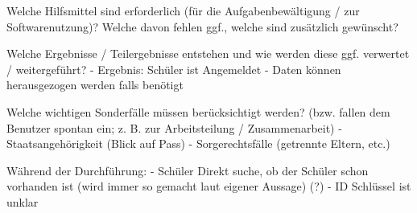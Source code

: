 Welche Hilfsmittel sind erforderlich (für die Aufgabenbewältigung / zur Softwarenutzung)? Welche davon fehlen ggf., welche sind zusätzlich gewünscht?	


















Welche Ergebnisse / Teilergebnisse entstehen und wie werden diese ggf. verwertet / weitergeführt?	
- Ergebnis: Schüler ist Angemeldet
- Daten können herausgezogen werden falls benötigt	










Welche wichtigen Sonderfälle müssen berücksichtigt werden? (bzw. fallen dem Benutzer spontan ein; z. B. zur Arbeitsteilung / Zusammenarbeit)	
- Staatsangehörigkeit (Blick auf Pass)
- Sorgerechtsfälle (getrennte Eltern, etc.)	
		














Während der Durchführung:		
- Schüler Direkt suche, ob der Schüler schon vorhanden ist (wird immer so gemacht laut eigener Aussage)	 (?)
- ID Schlüssel ist unklar























